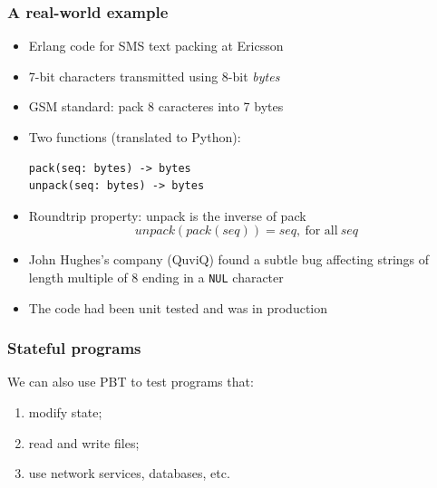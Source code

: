 \documentclass{beamer}
\newcommand{\bs}{\symbol{92}}
\begin{document}
\begin{frame}
  \frametitle{A real-world example}
  \begin{itemize}
  \item Erlang code for SMS text packing at Ericsson
  \item 7-bit characters transmitted using 8-bit \emph{bytes}
  \item GSM standard: pack 8 caracteres into 7 bytes
\item Two functions (translated to Python):
\begin{verbatim}
pack(seq: bytes) -> bytes
unpack(seq: bytes) -> bytes
\end{verbatim}
\item Roundtrip property: unpack is the inverse of pack
  \[ unpack(pack(seq)) = seq, ~\text{for all}~ seq \]
\end{itemize}

\framebreak

  \begin{itemize}
  \item John Hughes's company (QuviQ) found a subtle bug 
    affecting strings of length multiple of 8
    ending in a \texttt{\bs NUL} character
  \item The code had been unit tested and  was in production
  \end{itemize}
\end{frame}

\begin{frame}
  \frametitle{Stateful programs}

We can also use PBT to test programs that:
\begin{enumerate}
\item modify state;
\item read and write files;
\item use network services, databases, etc.
\end{enumerate}
\end{frame}
\end{document}
